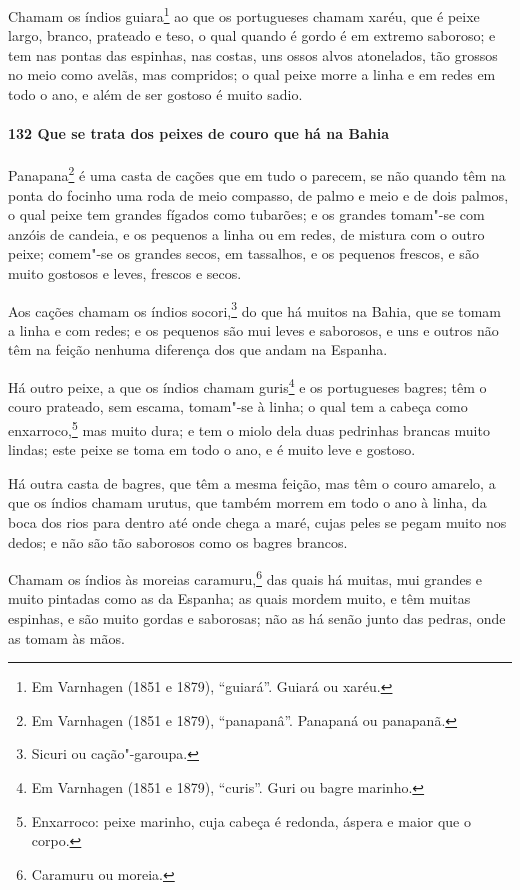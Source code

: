 \begin{linenumbers}
Chamam os índios guiara\footnote{ Em Varnhagen (1851 e 1879), ``guiará''. Guiará ou
xaréu.} ao que os portugueses chamam xaréu, que é peixe largo, branco, prateado e teso, o
qual quando é gordo é em extremo saboroso; e tem nas pontas das espinhas, nas costas, uns
ossos alvos atonelados, tão grossos no meio como avelãs, mas compridos; o qual peixe morre
a linha e em redes em todo o ano, e além de ser gostoso é muito sadio.

\paragraph{132 Que se trata dos peixes de couro que há na Bahia}\quad
Panapana\footnote{ Em Varnhagen (1851 e 1879), ``panapanâ''. Panapaná ou panapanã.} é uma
casta de cações que em tudo o parecem, se não quando têm na ponta do focinho uma roda de
meio compasso, de palmo e meio e de dois palmos, o qual peixe tem grandes fígados como
tubarões; e os grandes tomam"-se com anzóis de candeia, e os pequenos a linha ou em redes,
de mistura com o outro peixe; comem"-se os grandes secos, em tassalhos, e os pequenos
frescos, e são muito gostosos e leves, frescos e secos.

Aos cações chamam os índios socori,\footnote{ Sicuri ou cação"-garoupa.} do que há muitos
na Bahia, que se tomam a linha e com redes; e os pequenos são mui leves e saborosos, e uns
e outros não têm na feição nenhuma diferença dos que andam na Espanha.

Há outro peixe, a que os índios chamam guris\footnote{ Em Varnhagen (1851 e 1879),
``curis''. Guri ou bagre marinho.} e os portugueses bagres; têm o couro prateado, sem
escama, tomam"-se à linha; o qual tem a cabeça como enxarroco,\footnote{ Enxarroco: peixe
marinho, cuja cabeça é redonda, áspera e maior que o corpo.} mas muito dura; e tem o
miolo dela duas pedrinhas brancas muito lindas; este peixe se toma em todo o ano, e é
muito leve e gostoso.

Há outra casta de bagres, que têm a mesma feição, mas têm o couro amarelo, a que os índios
chamam urutus, que também morrem em todo o ano à linha, da boca dos rios para dentro até
onde chega a maré, cujas peles se pegam muito nos dedos; e não são tão saborosos como os
bagres brancos.

Chamam os índios às moreias caramuru,\footnote{ Caramuru ou moreia.} das quais há muitas,
mui grandes e muito pintadas como as da Espanha; as quais mordem muito, e têm muitas
espinhas, e são muito gordas e saborosas; não as há senão junto das pedras, onde as tomam
às mãos.


\end{linenumbers}
